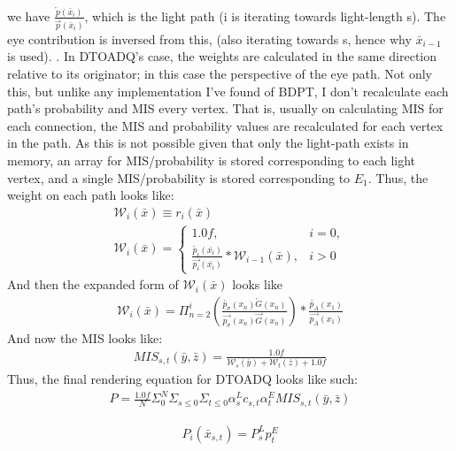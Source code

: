 \documentclass{article}
\begin{document}
we have $\frac{\overleftarrow{p}(\bar{x}_i)}{\overrightarrow{p}(\bar{x}_i)}$,
which is the light path (i is iterating towards light-length s). The eye
contribution is inversed from this, (also iterating towards s, hence why
$\bar{x}_{i-1}$ is used). . In DTOADQ's case, the weights are calculated in the
same direction relative to its originator; in this case the perspective of the
eye path. Not only this, but unlike any implementation I've found of BDPT, I
don't recalculate each path's probability and MIS every vertex. That is, usually
on calculating MIS for each connection, the MIS and probability values are
recalculated for each vertex in the path. As this is not possible given that
only the light-path exists in memory, an array for MIS/probability is stored
corresponding to each light vertex, and a single MIS/probability is stored
corresponding to $E_1$. Thus, the weight on each path looks like:
  \begin{align}
    \mathcal{W}_i(\bar{x}) \equiv r_i(\bar{x})\\
    \mathcal{W}_i (\bar{x}) = 
    \begin{cases}
      1.0f, & i = 0,\\
      \frac{\overleftarrow{p_i}(\bar{x_i})}{\overrightarrow{p_i}(\bar{x_i})} *
      \mathcal{W}_{i-1}(\bar{x}), & i > 0
    \end{cases}
  \end{align}
    And then the expanded form of $\mathcal{W}_i(\bar{x})$ looks like
  \begin{align}
    \mathcal{W}_i(\bar{x}) = \Pi_{n=2}^i(\frac{\overleftarrow
    {p_{\sigma}}(x_n)\overleftarrow {G}(x_n)}
    {\overrightarrow{p_{\sigma}}(x_n)\overrightarrow{G}(x_n)})
    * \frac{\overleftarrow{p_A}(x_1)}{\overrightarrow{p_A}(x_1)}
  \end{align}
    And now the MIS looks like:
  \begin{align}
    MIS_{s, t}(\bar{y}, \bar{z}) =
    \frac{1.0f}{\mathcal{W}_s(\bar{y}) + \mathcal{W}_t(\bar{z}) + 1.0f}
  \end{align}
    Thus, the final rendering equation for DTOADQ looks like such:
  \begin{align}
    P = \frac{1.0f}{N} \Sigma_{0}^{N} \Sigma_{s \le 0} \Sigma_{t \le 0}
    \alpha^L_s c_{s,t} \alpha^E_t MIS_{s, t}(\bar{y}, \bar{z})
  \end{align}


  \begin{align}
    P_i(\bar{x}_{s, t}) = P^L_s p^E_t
  \end{align}
\end{document}
